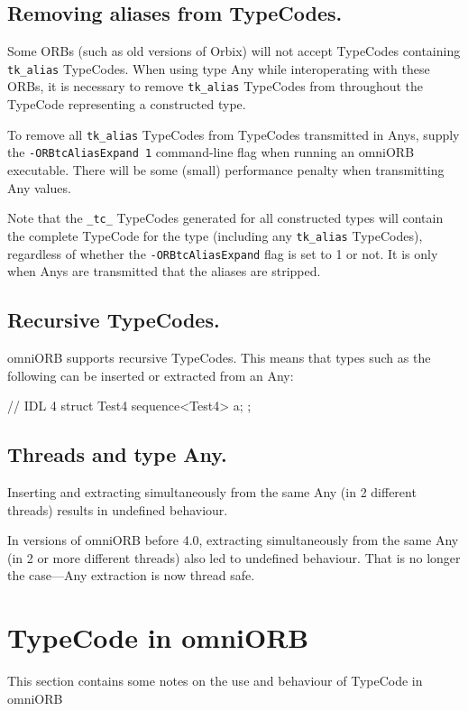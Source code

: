 \documentclass[11pt,twoside,a4paper]{book}
\newcommand{\code}[1]{\texttt{#1}}
\begin{document}
\subsection{Removing aliases from TypeCodes.}
Some ORBs (such as old versions of Orbix) will not accept TypeCodes
containing \code{tk\_alias} TypeCodes. When using type Any while
interoperating with these ORBs, it is necessary to remove
\code{tk\_alias} TypeCodes from throughout the TypeCode representing a
constructed type.

To remove all \code{tk\_alias} TypeCodes from TypeCodes transmitted in
Anys, supply the \texttt{-ORBtcAliasExpand 1} command-line flag when
running an omniORB executable. There will be some (small) performance
penalty when transmitting Any values.

Note that the \code{\_tc\_} TypeCodes generated for all constructed
types will contain the complete TypeCode for the type (including any
\code{tk\_alias} TypeCodes), regardless of whether the
\texttt{-ORBtcAliasExpand} flag is set to 1 or not. It is only when
Anys are transmitted that the aliases are stripped.

\subsection{Recursive TypeCodes.}
omniORB supports recursive TypeCodes. This means that types such as
the following can be inserted or extracted from an Any:

\begin{idllisting}
// IDL 4
struct Test4 {
  sequence<Test4> a;
};
\end{idllisting}


\subsection{Threads and type Any.}
Inserting and extracting simultaneously from the same Any (in 2
different threads) results in undefined behaviour.

In versions of omniORB before 4.0, extracting simultaneously from the
same Any (in 2 or more different threads) also led to undefined
behaviour. That is no longer the case---Any extraction is now thread
safe.


\section{TypeCode in omniORB}

This section contains some notes on the use and behaviour of TypeCode
in omniORB
\end{document}
